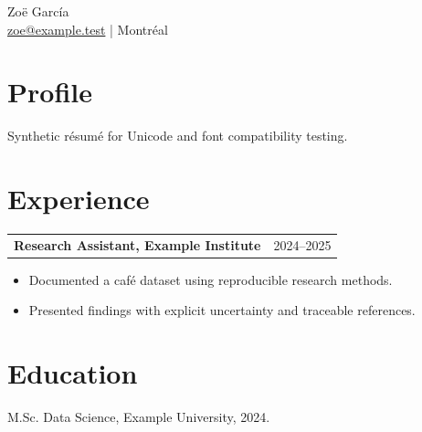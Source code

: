 \documentclass[11pt]{article}
\begin{document}
{\LARGE Zoë García}\\
\href{mailto:zoe@example.test}{zoe@example.test} | Montréal
\section*{Profile}
Synthetic résumé for Unicode and font compatibility testing.
\section*{Experience}
\begin{tabularx}{\textwidth}{@{}Xr@{}}
\textbf{Research Assistant, Example Institute} & 2024--2025\\
\end{tabularx}
\begin{itemize}
\item Documented a café dataset using reproducible research methods.
\item Presented findings with explicit uncertainty and traceable references.
\end{itemize}
\section*{Education}
M.Sc. Data Science, Example University, 2024.
\end{document}
